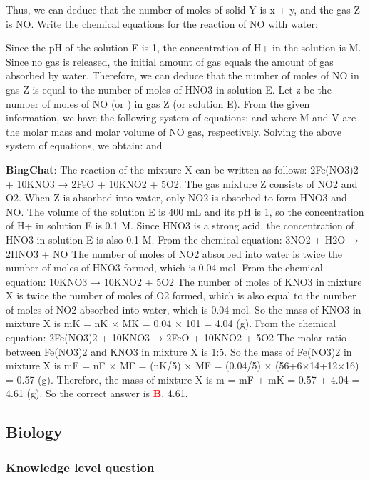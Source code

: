 \documentclass{article}
\begin{document}
{\begin{mdframed}[linewidth=1pt,linecolor=red]
		Thus, we can deduce that the number of moles of solid Y is x + y, and the gas Z is NO.
		Write the chemical equations for the reaction of NO with water:
		
		
		
		Since the pH of the solution E is 1, the concentration of H+ in the solution is  M. Since no gas is released, the initial amount of gas equals the amount of gas absorbed by water. Therefore, we can deduce that the number of moles of NO in gas Z is equal to the number of moles of HNO3 in solution E.
		Let z be the number of moles of NO (or ) in gas Z (or solution E).
		From the given information, we have the following system of equations:
		 and 
		where M and V are the molar mass and molar volume of NO gas, respectively. Solving the above system of equations, we obtain:  and 
		
		
		\textbf{BingChat}: The reaction of the mixture X can be written as follows: 2Fe(NO3)2 + 10KNO3 → 2FeO + 10KNO2 + 5O2. The gas mixture Z consists of NO2 and O2. When Z is absorbed into water, only NO2 is absorbed to form HNO3 and NO. The volume of the solution E is 400 mL and its pH is 1, so the concentration of H+ in solution E is 0.1 M. Since HNO3 is a strong acid, the concentration of HNO3 in solution E is also 0.1 M. From the chemical equation: 3NO2 + H2O → 2HNO3 + NO The number of moles of NO2 absorbed into water is twice the number of moles of HNO3 formed, which is 0.04 mol. From the chemical equation: 10KNO3 → 10KNO2 + 5O2 The number of moles of KNO3 in mixture X is twice the number of moles of O2 formed, which is also equal to the number of moles of NO2 absorbed into water, which is 0.04 mol. So the mass of KNO3 in mixture X is mK = nK × MK = 0.04 × 101 = 4.04 (g). From the chemical equation: 2Fe(NO3)2 + 10KNO3 → 2FeO + 10KNO2 + 5O2 The molar ratio between Fe(NO3)2 and KNO3 in mixture X is 1:5. So the mass of Fe(NO3)2 in mixture X is mF = nF × MF = (nK/5) × MF = (0.04/5) × (56+6×14+12×16) = 0.57 (g). Therefore, the mass of mixture X is m = mF + mK = 0.57 + 4.04 = 4.61 (g). So the correct answer is \textcolor{red}{\textbf{B}}. 4.61.
		
		
		
	\end{mdframed}	
	
	\subsection{Biology}
	\label{VNHSGE_Bio}


	\subsubsection{Knowledge level question}
	\label{VNHSGE_Bio_K}
	
}
\end{document}
